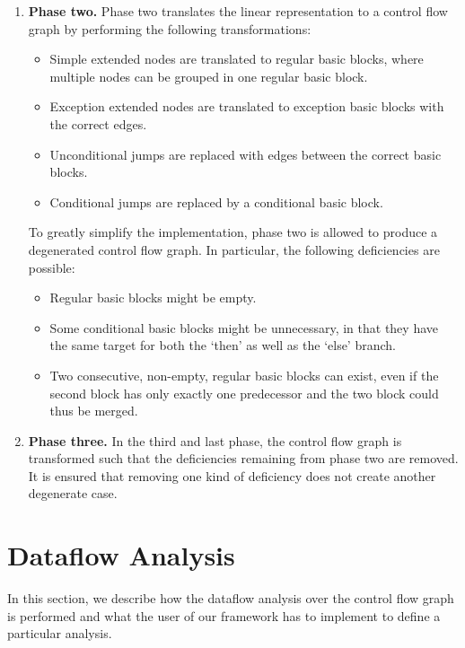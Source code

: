 \begin{enumerate}
    \item \textbf{Phase two.} Phase two translates the linear representation to a control flow graph
    by performing the following transformations:
    \begin{itemize}
        \item Simple extended nodes are translated to regular basic blocks, where multiple nodes
        can be grouped in one regular basic block.
        \item Exception extended nodes are translated to exception basic blocks with the correct edges.
        \item Unconditional jumps are replaced with edges between the correct basic blocks.
        \item Conditional jumps are replaced by a conditional basic block.
    \end{itemize}
    To greatly simplify the implementation, phase two is allowed to produce a degenerated control flow
    graph. In particular, the following deficiencies are possible:
    \begin{itemize}
    \item Regular basic blocks might be empty.
    \item Some conditional basic blocks might be unnecessary, in that they have the same target for both
    the `then' as well as the `else' branch.
    \item Two consecutive, non-empty, regular basic blocks can exist, even if the second block has only
    exactly one predecessor and the two block could thus be merged.
    \end{itemize}
    \item \textbf{Phase three.} In the third and last phase, the control flow graph is transformed such that
    the deficiencies remaining from phase two are removed. It is ensured that removing one kind of deficiency
    does not create another degenerate case.
\end{enumerate}






\section{Dataflow Analysis}

In this section, we describe how the dataflow analysis over the control
flow graph is performed and what the user of our framework has to implement to
define a particular analysis.


